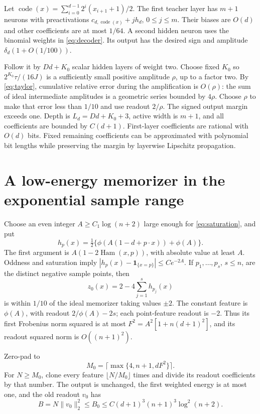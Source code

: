 \documentclass[11pt]{article}
\theoremstyle{remark}\newtheorem{remark}[theorem]{Remark}
\begin{document}
Let $\operatorname{code}(x)=\sum_{i=0}^{d-1}2^i(x_{i+1}+1)/2$.
The first teacher layer has $m+1$ neurons with preactivations
$c_{d,\operatorname{code}(x)}+jh_d$, $0\le j\le m$.
Their biases are $O(d)$ and other coefficients are at most $1/64$.
A second hidden neuron uses the binomial weights in
\eqref{eq:decoder}. Its output has the desired sign and
amplitude $\delta_d(1+O(1/100))$.

Follow it by $Dd+K_0$ scalar hidden layers of weight two.
Choose fixed $K_0$ so $2^{K_0}\tau/(16J)$ is a sufficiently
small positive amplitude $\rho$, up to a factor two.
By \eqref{eq:taylor}, cumulative relative error during the
amplification is $O(\rho)$: the sum of ideal intermediate
amplitudes is a geometric series bounded by $4\rho$.
Choose $\rho$ to make that error less than $1/10$ and use
readout $2/\rho$. The signed output margin exceeds one.
Depth is $L_d=Dd+K_0+3$, active width is $m+1$, and all
coefficients are bounded by $C(d+1)$.
First-layer coefficients are rational with $O(d)$ bits.
Fixed remaining coefficients can be approximated with polynomial
bit lengths while preserving the margin by layerwise Lipschitz
propagation.

\section{A low-energy memorizer in the exponential sample range}
Choose an even integer $A\ge C_1\log(n+2)$ large enough for
\eqref{eq:saturation}, and put
\[
 h_p(x)=\tfrac12\{\phi(A(1-d+p\cdot x))+\phi(A)\}.
\]
The first argument is $A(1-2\operatorname{Ham}(x,p))$, with
absolute value at least $A$. Oddness and saturation imply
$|h_p(x)-\mathbf1_{\{x=p\}}|\le Ce^{-2A}$.
If $p_1,\ldots,p_s$, $s\le n$, are the distinct negative sample
points, then
\[
 z_0(x)=2-4\sum_{j=1}^s h_{p_j}(x)
\]
is within $1/10$ of the ideal memorizer taking values $\pm2$.
The constant feature is $\phi(A)$, with readout
$2/\phi(A)-2s$; each point-feature readout is $-2$.
Thus its first Frobenius norm squared is at most
$F^2=A^2[1+n(d+1)^2]$, and its readout squared norm is
$O((n+1)^2)$.

Zero-pad to
\begin{equation}\label{eq:MB}
 M_0=\lceil\max\{4,n+1,dF^2\}\rceil.
\end{equation}
For $N\ge M_0$, clone every feature $\lfloor N/M_0\rfloor$
times and divide its readout coefficients by that number.
The output is unchanged, the first weighted energy is at
most one, and the old readout $v_0$ has
\begin{equation}\label{eq:B0}
 B=N\|v_0\|_2^2\le B_0
       \le C(d+1)^3(n+1)^3\log^2(n+2).
\end{equation}
\end{document}

